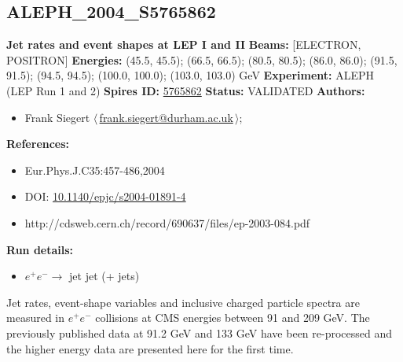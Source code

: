 \subsection[ALEPH\_2004\_S5765862]{ALEPH\_2004\_S5765862\,\cite{Heister:2003aj}}
\textbf{Jet rates and event shapes at LEP I and II}\newline
\textbf{Beams:} [ELECTRON, POSITRON] \newline
\textbf{Energies:} (45.5, 45.5); (66.5, 66.5); (80.5, 80.5); (86.0, 86.0); (91.5, 91.5); (94.5, 94.5); (100.0, 100.0); (103.0, 103.0) GeV \newline
\textbf{Experiment:} ALEPH (LEP Run 1 and 2) \newline
\textbf{Spires ID:} \href{http://www.slac.stanford.edu/spires/find/hep/www?rawcmd=key+5765862}{5765862}\newline
\textbf{Status:} VALIDATED\newline
\textbf{Authors:}
\begin{itemize}
  \item Frank Siegert $\langle\,$\href{mailto:frank.siegert@durham.ac.uk}{frank.siegert@durham.ac.uk}$\,\rangle$;
\end{itemize}
\textbf{References:}
\begin{itemize}
  \item Eur.Phys.J.C35:457-486,2004
  \item DOI: \href{http://dx.doi.org/10.1140/epjc/s2004-01891-4}{10.1140/epjc/s2004-01891-4}
  \item http://cdsweb.cern.ch/record/690637/files/ep-2003-084.pdf
\end{itemize}
\textbf{Run details:}
\begin{itemize}

  \item $e^+ e^- \to$ jet jet (+ jets)\end{itemize}

\noindent Jet rates, event-shape variables and inclusive charged particle spectra are measured in $e^+ e^-$ collisions at CMS energies between 91 and 209 GeV. The previously published data at 91.2 GeV and 133 GeV have been re-processed and the higher energy data are presented here for the first time.

\clearpage


\clearpage

